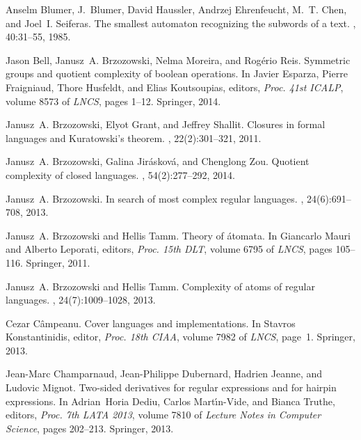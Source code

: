 \documentclass{article}
\begin{document}
\newcommand{\etalchar}[1]{$^{#1}$}
\begin{thebibliography}{BBMR14}

\bibitem[BBH{\etalchar{+}}85]{blumer85:_small_autom_recog_subwor_of_text}
Anselm Blumer, J.~Blumer, David Haussler, Andrzej Ehrenfeucht, M.~T. Chen, and
  Joel~I. Seiferas.
\newblock The smallest automaton recognizing the subwords of a text.
, 40:31--55, 1985.

Jason Bell, Janusz~A. Brzozowski, Nelma Moreira, and Rog{\'e}rio Reis.
\newblock Symmetric groups and quotient complexity of boolean operations.
\newblock In Javier Esparza, Pierre Fraigniaud, Thore Husfeldt, and Elias
  Koutsoupias, editors, {\em Proc. 41st ICALP}, volume 8573 of {\em LNCS},
  pages 1--12. Springer, 2014.

Janusz~A. Brzozowski, Elyot Grant, and Jeffrey Shallit.
\newblock Closures in formal languages and {Kuratowski}'s theorem.
, 22(2):301--321, 2011.

Janusz~A. Brzozowski, Galina Jir{\'a}skov{\'a}, and Chenglong Zou.
\newblock Quotient complexity of closed languages.
, 54(2):277--292, 2014.

Janusz~A. Brzozowski.
\newblock In search of most complex regular languages.
, 24(6):691--708, 2013.

Janusz~A. Brzozowski and Hellis Tamm.
\newblock Theory of {\'a}tomata.
\newblock In Giancarlo Mauri and Alberto Leporati, editors, {\em Proc. 15th
  DLT}, volume 6795 of {\em LNCS}, pages 105--116. Springer, 2011.

Janusz~A. Brzozowski and Hellis Tamm.
\newblock Complexity of atoms of regular languages.
, 24(7):1009--1028, 2013.

Cezar C{\^a}mpeanu.
\newblock Cover languages and implementations.
\newblock In Stavros Konstantinidis, editor, {\em Proc. 18th CIAA}, volume 7982
  of {\em LNCS}, page~1. Springer, 2013.

Jean{-}Marc Champarnaud, Jean{-}Philippe Dubernard, Hadrien Jeanne, and Ludovic
  Mignot.
\newblock Two-sided derivatives for regular expressions and for hairpin
  expressions.
\newblock In Adrian~Horia Dediu, Carlos Mart{\'{\i}}n{-}Vide, and Bianca
  Truthe, editors, {\em Proc. 7th {LATA} 2013}, volume 7810 of {\em Lecture
  Notes in Computer Science}, pages 202--213. Springer, 2013.


\end{thebibliography}
\end{document}
